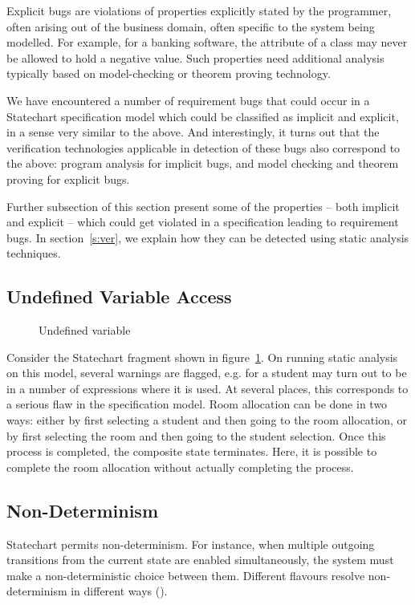 \documentclass[12pt,a4paper]{article}
\begin{document}
Explicit bugs are violations of properties explicitly stated by the programmer, often arising out of the business domain, often specific to the system being modelled. For example, for a banking software, the \lstinline@balance@ attribute of a \lstinline@BankAccount@ class may never be allowed to hold a negative value. Such properties need additional analysis typically based on model-checking or theorem proving technology. 

We have encountered a number of requirement bugs that could occur in a Statechart specification model which could be classified as implicit and explicit, in a sense very similar to the above. And interestingly, it turns out that the verification technologies applicable in detection of these bugs also correspond to the above: program analysis for implicit bugs, and model checking and theorem proving for explicit bugs.

Further subsection of this section present some of the properties -- both implicit and explicit -- which could get violated in a specification leading to requirement bugs.  In section~\ref{s:ver}, we explain how they can be detected using static analysis techniques.

\subsection{Undefined Variable Access}
\begin{figure}
\caption{Undefined variable}
\label{f:undefined}
\end{figure}

Consider the Statechart fragment shown in figure~\ref{f:undefined}. On running static analysis on this model, several warnings are flagged, e.g. \lstinline@roomNumber@ for a student may turn out to be \lstinline@nil@ in a number of expressions where it is used. At several places, this corresponds to a serious flaw in the specification model. Room allocation can be done in two ways: either by first selecting a student and then going to the room allocation, or by first selecting the room and then going to the student selection. Once this process is completed, the composite state \lstinline@AllocateRoom@ terminates. Here, it is possible to complete the room allocation without actually completing the process. 

\subsection{Non-Determinism}
Statechart permits non-determinism. For instance, when multiple outgoing transitions from the current state are enabled simultaneously, the system must make a non-deterministic choice between them. Different flavours resolve non-determinism in different ways ().
\end{document}
